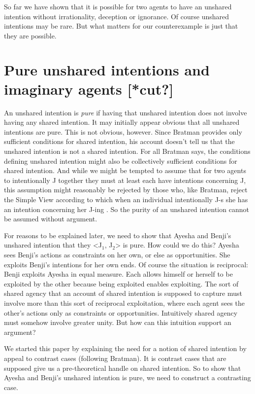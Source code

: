 \documentclass[12pt,\papersize]{extarticle}
\begin{document}
So far we have shown that it is possible for two agents to have an unshared intention without irrationality, deception or ignorance.
Of course unshared intentions may be rare. 
But what matters for our counterexample is just that they are possible. 



\section{Pure unshared intentions and imaginary agents [*cut?]}
An unshared intention is \emph{pure} if having that unshared intention does not involve having any shared intention. 
It may initially appear obvious that all unshared intentions are pure. 
This is not obvious, however.
Since Bratman provides only sufficient conditions for shared intention, his account doesn't tell us that the unshared intention is not a shared intention.
For all Bratman says, the conditions defining unshared intention might also be collectively sufficient conditions for shared intention. 
And while we might be tempted to assume that for two agents to intentionally J together they must at least each have intentions concerning J, 
this assumption might reasonably be rejected by those who, like Bratman, reject the Simple View according to which when an individual intentionally J-s she has an intention concerning her J-ing \citep{Bratman:1984jr}.
So the purity of an unshared intention cannot be assumed without argument.

For reasons to be explained later, we need to show that  Ayesha and Benji's unshared intention that they <J$_1$, J$_2$>  is pure.
How could we do this? 
Ayesha sees Benji's actions as constraints on her own, or else as opportunities.
She exploits Benji's intentions for her own ends.
Of course the situation is reciprocal: Benji exploits Ayesha in equal measure.
Each allows himself or herself to be exploited by the other because being exploited enables exploiting.
The sort of shared agency that an account of shared intention is supposed to capture must involve more than this sort of reciprocal exploitation, where each agent sees the other's actions only as constraints or opportunities. 
Intuitively shared agency must somehow involve greater unity.
But how can this intuition support an argument?



We started this paper by explaining the need for a notion of shared intention by appeal to contrast cases (following Bratman). 
It is contrast cases that are supposed give us a pre-theoretical handle on shared intention.
So to show that Ayesha and Benji's unshared intention is pure, we need to construct a contrasting case.
\end{document}
